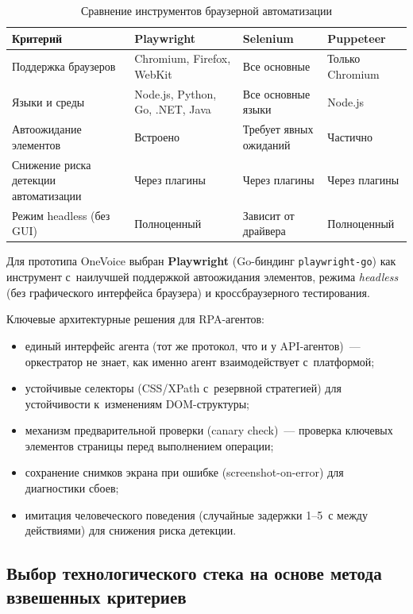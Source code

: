 \begin{table}[H]
  \caption{Сравнение инструментов браузерной автоматизации}
  \label{tab:rpa-tools}
  \small
  \begin{tabularx}{\textwidth}{|p{3.5cm}|X|X|X|}
    \hline
    \textbf{Критерий} & \textbf{Playwright} & \textbf{Selenium} & \textbf{Puppeteer} \\
    \hline
    Поддержка браузеров & Chromium, Firefox, WebKit & Все основные & Только Chromium \\
    \hline
    Языки и среды & Node.js, Python, Go, .NET, Java & Все основные языки & Node.js \\
    \hline
    Автоожидание элементов & Встроено & Требует явных ожиданий & Частично \\
    \hline
    Снижение риска детекции автоматизации & Через плагины & Через плагины & Через плагины \\
    \hline
    Режим headless (без GUI) & Полноценный & Зависит от драйвера & Полноценный \\
    \hline
  \end{tabularx}
\end{table}

Для прототипа OneVoice выбран \textbf{Playwright} (Go-биндинг \texttt{playwright-go}) как инструмент с~наилучшей поддержкой автоожидания элементов, режима \textit{headless} (без графического интерфейса браузера) и кроссбраузерного тестирования.

Ключевые архитектурные решения для RPA-агентов:

\begin{itemize}
  \item единый интерфейс агента (тот же протокол, что и у API-агентов)~--- оркестратор не знает, как именно агент взаимодействует с~платформой;
  \item устойчивые селекторы (CSS/XPath с~резервной стратегией) для устойчивости к~изменениям DOM-структуры;
  \item механизм предварительной проверки (canary check)~--- проверка ключевых элементов страницы перед выполнением операции;
  \item сохранение снимков экрана при ошибке (screenshot-on-error) для диагностики сбоев;
  \item имитация человеческого поведения (случайные задержки 1--5~с между действиями) для снижения риска детекции.
\end{itemize}

\subsection{Выбор технологического стека на основе метода взвешенных критериев}
\label{subsec:tech-stack}

